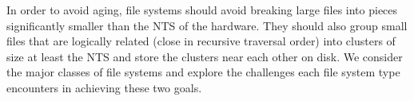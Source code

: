 In order to avoid aging, file systems should avoid breaking large files into
pieces significantly smaller than the NTS of the hardware. They should also
group small files that are logically related (close in recursive traversal
order) into clusters of size at least the NTS and store the clusters near each
other on disk.  We consider the major classes of file systems and explore the
challenges each file system type encounters in achieving these two goals.



\newcommand{\addalphaplot}[3]
{
  \addplot[color=#2, line width=0.75pt, mark=#3]
  table[x=read_size_bytes, y expr=\thisrow{read_size_bytes} * \thisrow{num_reads} / \thisrow{time_seconds} / 1000000] {../data/device_measurements/#1_alpha_bw.csv};
}

